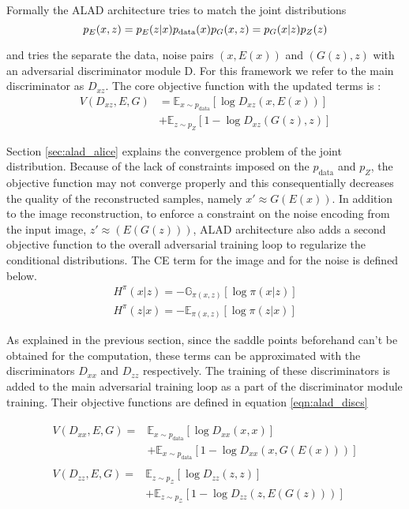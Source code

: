 Formally the ALAD architecture tries to match the joint distributions 
\begin{equation}
    p_{E} (x, z) = p_{E}(z | x) p_{\text{data}}(x) \\[5pt]
    p_{G} (x, z) = p_{G}(x | z) p_{Z}(z)
\end{equation}

and tries the separate the data, noise pairs $(x, E(x))$ and $(G(z), z)$ with an adversarial
discriminator module D. For this framework we refer to the main discriminator as $D_{xz}$. The core
objective function with the updated terms is :
\begin{equation}
\begin{aligned} V\left(D_{x z}, E, G\right) &=\mathbb{E}_{x \sim p_{\text{data}}}\left[\log D_{x z}(x, E(x))\right] \\ &+\mathbb{E}_{z \sim p_{Z}}\left[1-\log D_{x z}(G(z), z)\right]
 \end{aligned}
\end{equation}

Section \ref{sec:alad_alice} explains the convergence problem of the joint distribution. Because of
the lack of constraints imposed on the $p_{\text{data}}$ and $p_{Z}$, the objective function may not
converge properly and this consequentially decreases the quality of the reconstructed samples,
namely $x' \approx G(E(x))$. In addition to the image reconstruction, to enforce a constraint on the
noise encoding from the input image, $z' \approx (E(G(z)))$, ALAD architecture also adds a second
objective function to the overall adversarial training loop to regularize the conditional
distributions. The CE term for the image and for the noise is defined below.
\begin{align}
    H^{\pi}(x | z)=-\mathbb{G}_{\pi(x, z)}[\log \pi(x | z)] \\[5pt]
    H^{\pi}(z | x)=-\mathbb{E}_{\pi(x, z)}[\log \pi(z | x)] 
\end{align}

As explained in the previous section, since the saddle points beforehand can't be obtained for the
computation, these terms can be approximated with the discriminators $D_{xx}$ and $D_{zz}$
respectively. The training of these discriminators is added to the main adversarial training loop as
a part of the discriminator module training. Their objective functions are defined in equation
\ref{eqn:alad_discs}

\begin{align}
    \label{eqn:alad_discs}
\begin{split} V\left(D_{x x}, E, G\right) ={}&\mathbb{E}_{x \sim p_{\text{data}}}\left[\log D_{x x}(x, x)\right] \\ &+\mathbb{E}_{x \sim p_{\text{data}}}\left[1-\log D_{x x}(x, G(E(x)))\right] \end{split}  \\[5pt]
\begin{split} V\left(D_{z z}, E, G\right) ={}&\mathbb{E}_{z \sim p_{\mathcal{Z}}}\left[\log D_{z z}(z, z)\right] \\ &+\mathbb{E}_{z \sim p_{\mathcal{Z}}}\left[1-\log D_{z z}(z, E(G(z)))\right] \end{split}    
\end{align}

